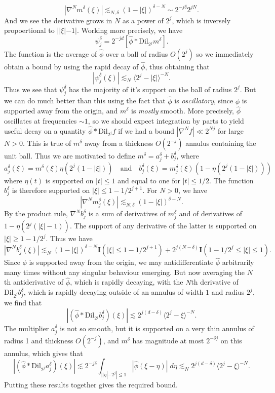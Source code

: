 %
\[ |\nabla^N m^\delta(\xi)| \lesssim_{N,\delta} (1 - |\xi|)^{\delta - N} \sim 2^{-j \delta} 2^{jN}. \]
%
And we see the derivative grows in $N$ as a power of $2^j$, which is inversely propoertional to $||\xi| - 1|$. Working more precisely, we have
%
\[ \psi^\delta_j = 2^{-jd} \left[ \widehat{\phi} * \text{Dil}_{2^j} m^\delta \right]. \]
%
The function is the average of $\widehat{\phi}$ over a ball of radius $O(2^j)$ so we immediately obtain a bound by using the rapid decay of $\widehat{\phi}$, thus obtaining that
%
\[ |\psi^\delta_j(\xi)| \lesssim_N \langle 2^j - |\xi| \rangle^{-N}. \]
% 
Thus we see that $\psi^\delta_j$ has the majority of it's support on the ball of radius $2^j$. But we can do much better than this using the fact that $\widehat{\phi}$ is \emph{oscillatory}, since $\phi$ is supported away from the origin, and $m^\delta$ is \emph{mostly} smooth. More precisely, $\widehat{\phi}$ oscillates at frequencies $\sim 1$, so we should expect integration by parts to yield useful decay on a quantity $\widehat{\phi} * \text{Dil}_{2^j} f$ if we had a bound $|\nabla^N f| \ll 2^{Nj}$ for large $N > 0$. This is true of $m^\delta$ away from a thickness $O(2^{-j})$ annulus containing the unit ball. Thus we are motivated to define $m^\delta = a^\delta_j + b^\delta_j$, where
%
\[ a^\delta_j(\xi) = m^\delta(\xi) \eta( 2^j (1 - |\xi|)) \quad\text{and}\quad b^\delta_j(\xi) = m^\delta_j(\xi) ( 1 - \eta( 2^j (1 - |\xi|)) ) \]
%
where $\eta(t)$ is supported on $|t| \leq 1$ and equal to one for $|t| \leq 1/2$. The function $b^\delta_j$ is therefore supported on $|\xi| \leq 1 - 1/2^{j+1}$. For $N > 0$, we have
% 
\[ |\nabla^N m^\delta_j(\xi)| \lesssim_{N,\delta} (1 - |\xi|)^{\delta-N}. \]
%
By the product rule, $\nabla^N b^\delta_j$ is a sum of derivatives of $m^\delta_j$ and of derivatives of $1 - \eta(2^j (|\xi| - 1))$. The support of any derivative of the latter is supported on $|\xi| \geq 1 - 1/2^j$. Thus we have
%
\[ |\nabla^N b^\delta_j(\xi)| \lesssim_N (1 - |\xi|)^{\delta - N} \mathbf{I}(|\xi| \leq 1 - 1/2^{j+1}) + 2^{j(N - \delta)} \mathbf{I}(1 - 1/2^j \leq |\xi| \leq 1). \]
%
Since $\phi$ is supported away from the origin, we may antidifferentiate $\widehat{\phi}$ arbitrarily many times without any singular behaviour emerging. But now averaging the $N$th antiderivative of $\widehat{\phi}$, which is rapidly decaying, with the $N$th derivative of $\text{Dil}_{2^j} b^\delta_j$, which is rapidly decaying outside of an annulus of width $1$ and radius $2^j$, we find that
%
\[ |(\widehat{\phi} * \text{Dil}_{2^j} b^\delta_j)(\xi)| \lesssim 2^{j(d - \delta)} \langle 2^j - \xi \rangle^{-N}. \]
%
The multiplier $a^\delta_j$ is not so smooth, but it is supported on a very thin annulus of radius 1 and thickness $O(2^{-j})$, and $m^\delta$ has magnitude at most $2^{- \delta j}$ on this annulus, which gives that
%
\[ |(\widehat{\phi} * \text{Dil}_{2^j} a^\delta_j)(\xi)| \lesssim 2^{-j\delta} \int_{||\eta| - 2^j| \leq 1} |\widehat{\phi}(\xi - \eta)|\; d\eta \lesssim_N 2^{j(d - \delta)} \langle 2^j - \xi \rangle^{-N}. \]
%
Putting these results together gives the required bound.

